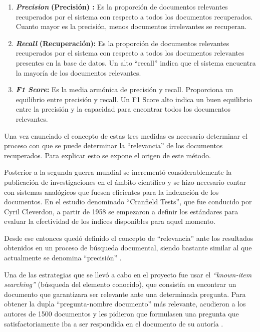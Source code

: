\documentclass[
  12pt,
  openany]{book}
\begin{document}
\begin{enumerate}
\def\labelenumi{\arabic{enumi}.}
\item
  \textbf{\emph{Precision}} \textbf{(Precisión) :} Es la proporción de documentos relevantes recuperados por el sistema con respecto a todos los documentos recuperados. Cuanto mayor es la precisión, menos documentos irrelevantes se recuperan.
\item
  \textbf{\emph{Recall}} \textbf{(Recuperación):} Es la proporción de documentos relevantes recuperados por el sistema con respecto a todos los documentos relevantes presentes en la base de datos. Un alto ``recall'' indica que el sistema encuentra la mayoría de los documentos relevantes.
\item
  \textbf{\emph{F1 Score}:} Es la media armónica de precisión y recall. Proporciona un equilibrio entre precisión y recall. Un F1 Score alto indica un buen equilibrio entre la precisión y la capacidad para encontrar todos los documentos relevantes.
\end{enumerate}

Una vez enunciado el concepto de estas tres medidas es necesario determinar el proceso con que se puede determinar la ``relevancia'' de los documentos recuperados. Para explicar esto se expone el origen de este método.

Posterior a la segunda guerra mundial se incrementó considerablemente la publicación de investigaciones en el ámbito científico y se hizo necesario contar con sistemas analógicos que fuesen eficientes para la indexación de los documentos. En el estudio denominado ``Cranfield Tests''\citep{harman2011}, que fue conducido por Cyril Cleverdon, a partir de 1958 se empezaron a definir los estándares para evaluar la efectividad de los índices disponibles para aquel momento.

Desde ese entonces quedó definido el concepto de ``relevancia'' ante los resultados obtenidos en un proceso de búsqueda documental, siendo bastante similar al que actualmente se denomina ``precisión'' .

Una de las estrategias que se llevó a cabo en el proyecto fue usar el \emph{``known-item searching''} (búsqueda del elemento conocido), que consistía en encontrar un documento que garantizara ser relevante ante una determinada pregunta. Para obtener la dupla ``pregunta-nombre documento'' más relevante, acudieron a los autores de 1500 documentos y les pidieron que formulasen una pregunta que satisfactoriamente iba a ser respondida en el documento de su autoría \citep{harman2011}.
\end{document}

